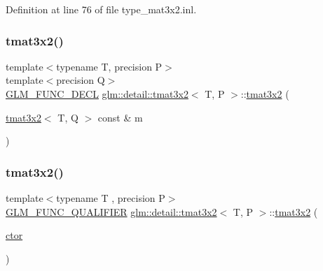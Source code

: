 Definition at line 76 of file type\+\_\+mat3x2.\+inl.

\mbox{\label{structglm_1_1detail_1_1tmat3x2_a293a68738c817050bcccf356d1c36171}} 
\subsubsection{\texorpdfstring{tmat3x2()}{tmat3x2()}\hspace{0.1cm}{\footnotesize\ttfamily [3/22]}}
{\footnotesize\ttfamily template$<$typename T, precision P$>$ \\
template$<$precision Q$>$ \\
\hyperlink{setup_8hpp_ab2d052de21a70539923e9bcbf6e83a51}{G\+L\+M\+\_\+\+F\+U\+N\+C\+\_\+\+D\+E\+CL} \hyperlink{structglm_1_1detail_1_1tmat3x2}{glm\+::detail\+::tmat3x2}$<$ T, P $>$\+::\hyperlink{structglm_1_1detail_1_1tmat3x2}{tmat3x2} (\begin{DoxyParamCaption}\item[{\hyperlink{structglm_1_1detail_1_1tmat3x2}{tmat3x2}$<$ T, Q $>$ const \&}]{m }\end{DoxyParamCaption})}

\mbox{\label{structglm_1_1detail_1_1tmat3x2_a370b3101c031c0789fe0a6fb33f5c13a}} 
\subsubsection{\texorpdfstring{tmat3x2()}{tmat3x2()}\hspace{0.1cm}{\footnotesize\ttfamily [4/22]}}
{\footnotesize\ttfamily template$<$typename T , precision P$>$ \\
\hyperlink{setup_8hpp_a33fdea6f91c5f834105f7415e2a64407}{G\+L\+M\+\_\+\+F\+U\+N\+C\+\_\+\+Q\+U\+A\+L\+I\+F\+I\+ER} \hyperlink{structglm_1_1detail_1_1tmat3x2}{glm\+::detail\+::tmat3x2}$<$ T, P $>$\+::\hyperlink{structglm_1_1detail_1_1tmat3x2}{tmat3x2} (\begin{DoxyParamCaption}\item[{\hyperlink{structglm_1_1detail_1_1tmat3x2_ae8783ababf4eb06fdbb048bb90ef3b03}{ctor}}]{ }\end{DoxyParamCaption})\hspace{0.3cm}{\ttfamily [explicit]}}



